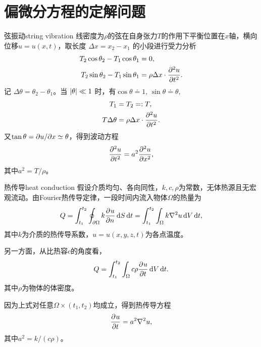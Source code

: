 \chapter{偏微分方程的定解问题}
\begin{example}{弦振动}{string vibration}
	线密度为$\rho$的弦在自身张力$T$的作用下平衡位置在$x$轴，横向位移$u = u(x,t)$，取长度 $\Delta x = x_2 - x_1$ 的小段进行受力分析
	\begin{align*}
		T_2\cos\theta_2 - T_1\cos\theta_1 &= 0,\\
		T_2\sin\theta_2 - T_1\sin\theta_1 &= \rho\Delta x \cdot \pv[2]ut.
	\end{align*}
	记 $\Delta\theta = \theta_2 - \theta_1$。当 $\abs\theta \ll 1$ 时，有$\cos\theta \doteq 1,\,\sin\theta \doteq \theta,$
	\begin{align*}
		T_1 &= T_2 =: T,\\
		T\Delta\theta &= \rho\Delta x \cdot \pv[2]ut.
	\end{align*}
	又$\tan\theta = \p u/\p x \simeq \theta$，得到波动方程
	\begin{equation}
		\pv[2]ut = a^2\pv[2]ux,
	\end{equation}
	其中$a^2 = T/\rho$。
\end{example}
\begin{example}{热传导}{heat conduction}
	假设介质均匀、各向同性，$k,c,\rho$为常数，无体热源且无宏观流动。由Fourier热传导定律，一段时间内流入物体$\Omega$的热量为
	\[
		Q = \int_{t_1}^{t_2}\oint_{\p\Omega}k\pv un\d S\d t = \int_{t_1}^{t_2}\int_\Omega k\laplacian u\d V\d t,
	\]
	其中$k$为介质的热传导系数，$u = u(x,y,z,t)$为各点温度。
	
	另一方面，从比热容$c$的角度看，
	\[
		Q = \int_{t_1}^{t_2}\int_\Omega c\rho\pv ut\d V\d t.
	\]
	其中$\rho$为物体的体密度。
	
	因为上式对任意$\Omega \times (t_1,t_2)$均成立，得到热传导方程
	\begin{equation}
		\pv ut = a^2\laplacian u,
	\end{equation}
	其中$a^2 = k/(c\rho)$。
\end{example}

